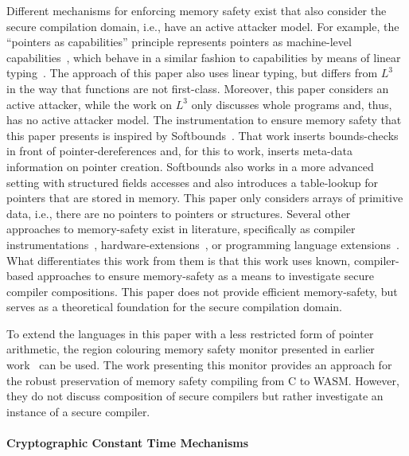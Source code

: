 \documentclass[acmsmall]{acmart}
\theoremstyle{definition}
\begin{document}
Different mechanisms for enforcing memory safety exist that also consider the secure compilation domain, i.e., have an active attacker model.
For example, the ``pointers as capabilities'' principle represents pointers as machine-level capabilities~\cite{korashy2021capableptrs}, which behave in a similar fashion to capabilities by means of linear typing~\cite{morrisett2005L3}.
The approach of this paper also uses linear typing, but differs from $L^{3}$~\cite{morrisett2005L3} in the way that functions are not first-class.
Moreover, this paper considers an active attacker, while the work on $L^{3}$ only discusses whole programs and, thus, has no active attacker model.
The instrumentation to ensure memory safety that this paper presents is inspired by Softbounds~\cite{nagarakatte2009soft}.
That work inserts bounds-checks in front of pointer-dereferences and, for this to work, inserts meta-data information on pointer creation.
Softbounds also works in a more advanced setting with structured fields accesses and also introduces a table-lookup for pointers that are stored in memory.
This paper only considers arrays of primitive data, i.e., there are no pointers to pointers or structures.
Several other approaches to memory-safety exist in literature, specifically as compiler instrumentations~\cite{akritidis2009baggy,younan2010paricheck,jung2021pico,shankaranarayana2023tailcheck,dhumbumroong2020boundwarden,nam2019framer,zhou2023fatptrs}, hardware-extensions~\cite{kwon2013lowfat,saileshwar2022heapcheck,chen2023flexpointer,kim2023whistle}, or programming language extensions~\cite{elliott2018checkedc,li2022formalcheckedc,jim2002cyclone,elliott2015guilt,west2005cuckoo,weis2019fyr,benoit2019uniqueness}.
What differentiates this work from them is that this work uses known, compiler-based approaches to ensure memory-safety as a means to investigate secure compiler compositions.
This paper does not provide efficient memory-safety, but serves as a theoretical foundation for the secure compilation domain.

To extend the languages in this paper with a less restricted form of pointer arithmetic, the region colouring memory safety monitor presented in earlier work~\cite{michael2023mswasm} can be used.
The work presenting this monitor provides an approach for the robust preservation of memory safety compiling from C to WASM.
However, they do not discuss composition of secure compilers but rather investigate an instance of a secure compiler.

\paragraph*{Cryptographic Constant Time Mechanisms}\label{subsec:relw:cctmechs}
\end{document}

